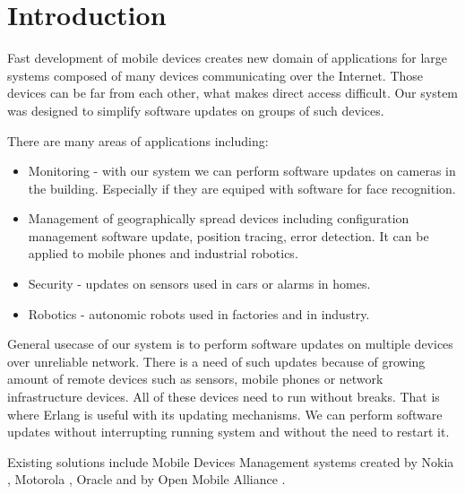 \section{Introduction}

Fast development of mobile devices creates new domain of applications for large systems composed of many devices communicating over the Internet.
Those devices can be far from each other, what makes direct access difficult. Our system was designed to simplify software updates on groups of such devices.

There are many areas of applications including:
\begin{itemize}
    \item Monitoring - with our system we can perform software updates on cameras in the building. Especially if they are equiped with software for face recognition.
    \item Management of geographically spread devices including configuration management software update, position tracing, error detection.
	It can be applied to mobile phones and industrial robotics.
    \item Security - updates on sensors used in cars or alarms in homes.
    \item Robotics - autonomic robots used in factories and in industry.
\end{itemize}

General usecase of our system is to perform software updates on multiple devices over unreliable network. There is a need of such updates because of growing amount of remote devices such as sensors, mobile phones or network infrastructure devices. All of these devices need to run without breaks. That is where Erlang is useful with its updating mechanisms. We can perform software updates without interrupting running system and without the need to restart it.

 Existing solutions include Mobile Devices Management systems created by Nokia \cite{nokia}, Motorola \cite{motorola}, Oracle \cite{oracle} and by Open Mobile Alliance \cite{oma}.
